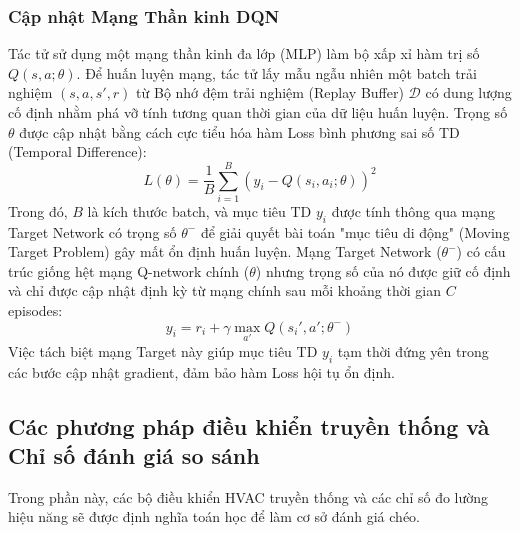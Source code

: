 \documentclass[12pt, a4paper]{article}
\begin{document}
\subsubsection{Cập nhật Mạng Thần kinh DQN}
Tác tử sử dụng một mạng thần kinh đa lớp (MLP) làm bộ xấp xỉ hàm trị số $Q(s, a; \theta)$. Để huấn luyện mạng, tác tử lấy mẫu ngẫu nhiên một batch trải nghiệm $(s, a, s', r)$ từ Bộ nhớ đệm trải nghiệm (Replay Buffer) $\mathcal{D}$ có dung lượng cố định nhằm phá vỡ tính tương quan thời gian của dữ liệu huấn luyện. Trọng số $\theta$ được cập nhật bằng cách cực tiểu hóa hàm Loss bình phương sai số TD (Temporal Difference):
\begin{equation}
L(\theta) = \frac{1}{B} \sum_{i=1}^{B} \left( y_i - Q(s_i, a_i; \theta) \right)^2
\end{equation}
Trong đó, $B$ là kích thước batch, và mục tiêu TD $y_i$ được tính thông qua mạng Target Network có trọng số $\theta^-$ để giải quyết bài toán "mục tiêu di động" (Moving Target Problem) gây mất ổn định huấn luyện. Mạng Target Network ($\theta^-$) có cấu trúc giống hệt mạng Q-network chính ($\theta$) nhưng trọng số của nó được giữ cố định và chỉ được cập nhật định kỳ từ mạng chính sau mỗi khoảng thời gian $C$ episodes:
\begin{equation}
y_i = r_i + \gamma \max_{a'} Q(s_i', a'; \theta^-)
\end{equation}
Việc tách biệt mạng Target này giúp mục tiêu TD $y_i$ tạm thời đứng yên trong các bước cập nhật gradient, đảm bảo hàm Loss hội tụ ổn định.

\subsection{Các phương pháp điều khiển truyền thống và Chỉ số đánh giá so sánh}
Trong phần này, các bộ điều khiển HVAC truyền thống và các chỉ số đo lường hiệu năng sẽ được định nghĩa toán học để làm cơ sở đánh giá chéo.
\end{document}
